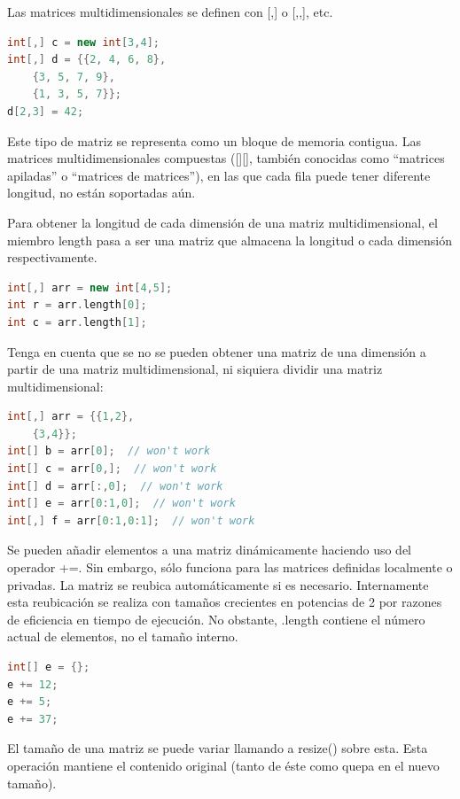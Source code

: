 \documentclass[12pt,twoside]{book}
\begin{document}
Las matrices multidimensionales se definen con [,] o [,,], etc.

\begin{lstlisting}[language=C++]
int[,] c = new int[3,4];
int[,] d = {{2, 4, 6, 8},
	{3, 5, 7, 9},
	{1, 3, 5, 7}};
d[2,3] = 42;
\end{lstlisting}


Este tipo de matriz se representa como un bloque de memoria contigua. Las matrices multidimensionales compuestas ([][], también conocidas como ``matrices apiladas'' o ``matrices de matrices''), en las que cada fila puede tener diferente longitud, no están soportadas aún.

Para obtener la longitud de cada dimensión de una matriz multidimensional, el miembro length pasa a ser una matriz que almacena la longitud o cada dimensión respectivamente.

\begin{lstlisting}[language=C++]
int[,] arr = new int[4,5];
int r = arr.length[0];
int c = arr.length[1];
\end{lstlisting}

Tenga en cuenta que se no se pueden obtener una matriz de una dimensión a partir de una matriz multidimensional, ni siquiera dividir una matriz multidimensional:

\begin{lstlisting}[language=C++]
int[,] arr = {{1,2},
	{3,4}};
int[] b = arr[0];  // won't work
int[] c = arr[0,];  // won't work
int[] d = arr[:,0];  // won't work
int[] e = arr[0:1,0];  // won't work
int[,] f = arr[0:1,0:1];  // won't work
\end{lstlisting}

Se pueden añadir elementos a una matriz dinámicamente haciendo uso del operador +=. Sin embargo, sólo funciona para las matrices definidas localmente o privadas. La matriz se reubica automáticamente si es necesario. Internamente esta reubicación se realiza con tamaños crecientes en potencias de 2 por razones de eficiencia en tiempo de ejecución. No obstante, .length contiene el número actual de elementos, no el tamaño interno.

\begin{lstlisting}[language=C++]
int[] e = {};
e += 12;
e += 5;
e += 37;
\end{lstlisting}

El tamaño de una matriz se puede variar llamando a resize() sobre esta. Esta operación mantiene el contenido original (tanto de éste como quepa en el nuevo tamaño).
\end{document}
